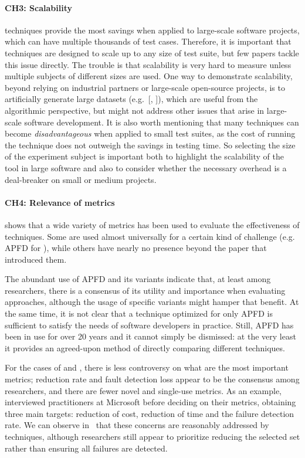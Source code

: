 \paragraph{CH3: Scalability}
\rt techniques provide the most savings when applied to large-scale software projects, which can have multiple thousands of test cases.
Therefore, it is important that techniques are designed to scale up to any size of test suite, but few papers tackle this issue directly.
The trouble is that scalability is very hard to measure unless multiple subjects of different sizes are used.
One way to demonstrate scalability, beyond relying on industrial partners or large-scale open-source projects, is to artificially generate large datasets (e.g.~[, ]), which are useful from the algorithmic perspective, but might not address other issues that arise in large-scale software development.
It is also worth mentioning that many \rt techniques can become \textit{disadvantageous} when applied to small test suites, as the cost of running the technique does not outweigh the savings in testing time.
So selecting the size of the experiment subject is important both to highlight the scalability of the tool in large software and also to consider whether the necessary overhead is a deal-breaker on small or medium projects.


\paragraph{CH4: Relevance of metrics}
 shows that a wide variety of metrics has been used to evaluate the effectiveness of \rt techniques.
Some are used almost universally for a certain kind of challenge (e.g. APFD for \tcp), while others have nearly no presence beyond the paper that introduced them.

The abundant use of APFD and its variants indicate that, at least among researchers, there is a consensus of its utility and importance when evaluating \tcp approaches, although the usage of specific variants might hamper that benefit.
At the same time, it is not clear that a technique optimized for only APFD is sufficient to satisfy the needs of software developers in practice.
Still, APFD has been in use for over 20 years and it cannot simply be dismissed: at the very least it provides an agreed-upon method of directly comparing different techniques.

For the cases of \tcs and \tsr, there is less controversy on what are the most important metrics; reduction rate and fault detection loss appear to be the consensus among researchers, and there are fewer novel and single-use metrics.
As an example,~ interviewed practitioners at Microsoft before deciding on their \tcs metrics, obtaining three main targets: reduction of cost, reduction of time and the failure detection rate.
We can observe in~ that these concerns are reasonably addressed by \tcs techniques, although researchers still appear to prioritize reducing the selected set rather than ensuring all failures are detected.

